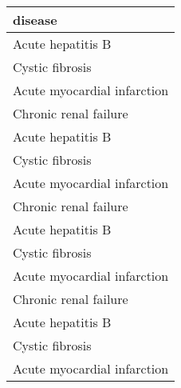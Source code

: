 \begin{tabular}{l}
  \toprule
 disease \\ 
  \midrule
  Acute hepatitis B \\ 
  Cystic fibrosis \\ 
  Acute myocardial infarction \\ 
  Chronic renal failure \\ 
  Acute hepatitis B \\ 
  Cystic fibrosis \\ 
  Acute myocardial infarction \\ 
  Chronic renal failure \\ 
  Acute hepatitis B \\ 
  Cystic fibrosis \\ 
  Acute myocardial infarction \\ 
  Chronic renal failure \\ 
  Acute hepatitis B \\ 
  Cystic fibrosis \\ 
  Acute myocardial infarction \\ 
   \bottomrule
\end{tabular}
